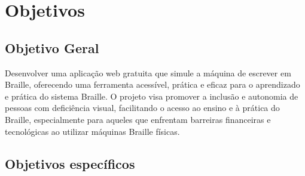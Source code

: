 \section{Objetivos}

\subsection{Objetivo Geral}

Desenvolver uma aplicação web gratuita que simule a máquina de escrever em Braille, oferecendo uma ferramenta acessível, prática e eficaz para o aprendizado e prática do sistema Braille. O projeto visa promover a inclusão e autonomia de pessoas com deficiência visual, facilitando o acesso ao ensino e à prática do Braille, especialmente para aqueles que enfrentam barreiras financeiras e tecnológicas ao utilizar máquinas Braille físicas.

\subsection{Objetivos específicos}

